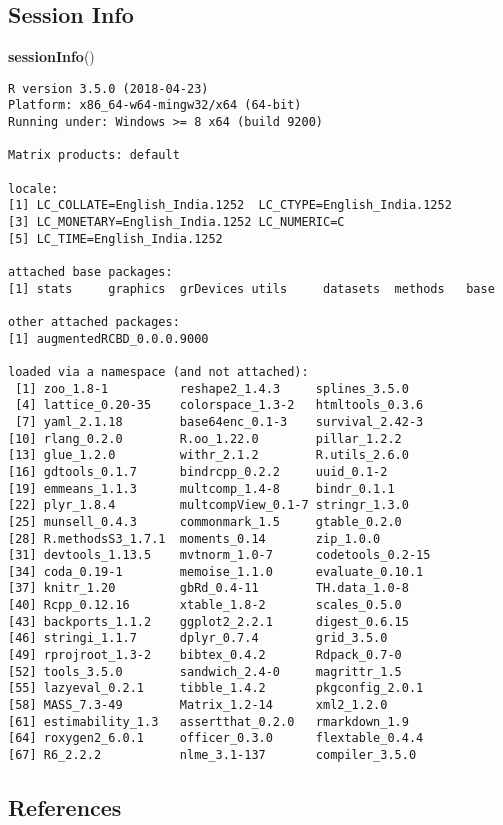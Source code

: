 \documentclass[]{article}
\newenvironment{Shaded}{\begin{snugshade}}{\end{snugshade}}
\newcommand{\KeywordTok}[1]{\textcolor[rgb]{0.13,0.29,0.53}{\textbf{#1}}}
\newcommand{\NormalTok}[1]{#1}
\begin{document}
\hypertarget{session-info}{%
\subsection{Session Info}\label{session-info}}

\begin{Shaded}
\begin{Highlighting}[]
\KeywordTok{sessionInfo}\NormalTok{()}
\end{Highlighting}
\end{Shaded}

\begin{verbatim}
R version 3.5.0 (2018-04-23)
Platform: x86_64-w64-mingw32/x64 (64-bit)
Running under: Windows >= 8 x64 (build 9200)

Matrix products: default

locale:
[1] LC_COLLATE=English_India.1252  LC_CTYPE=English_India.1252   
[3] LC_MONETARY=English_India.1252 LC_NUMERIC=C                  
[5] LC_TIME=English_India.1252    

attached base packages:
[1] stats     graphics  grDevices utils     datasets  methods   base     

other attached packages:
[1] augmentedRCBD_0.0.0.9000

loaded via a namespace (and not attached):
 [1] zoo_1.8-1          reshape2_1.4.3     splines_3.5.0     
 [4] lattice_0.20-35    colorspace_1.3-2   htmltools_0.3.6   
 [7] yaml_2.1.18        base64enc_0.1-3    survival_2.42-3   
[10] rlang_0.2.0        R.oo_1.22.0        pillar_1.2.2      
[13] glue_1.2.0         withr_2.1.2        R.utils_2.6.0     
[16] gdtools_0.1.7      bindrcpp_0.2.2     uuid_0.1-2        
[19] emmeans_1.1.3      multcomp_1.4-8     bindr_0.1.1       
[22] plyr_1.8.4         multcompView_0.1-7 stringr_1.3.0     
[25] munsell_0.4.3      commonmark_1.5     gtable_0.2.0      
[28] R.methodsS3_1.7.1  moments_0.14       zip_1.0.0         
[31] devtools_1.13.5    mvtnorm_1.0-7      codetools_0.2-15  
[34] coda_0.19-1        memoise_1.1.0      evaluate_0.10.1   
[37] knitr_1.20         gbRd_0.4-11        TH.data_1.0-8     
[40] Rcpp_0.12.16       xtable_1.8-2       scales_0.5.0      
[43] backports_1.1.2    ggplot2_2.2.1      digest_0.6.15     
[46] stringi_1.1.7      dplyr_0.7.4        grid_3.5.0        
[49] rprojroot_1.3-2    bibtex_0.4.2       Rdpack_0.7-0      
[52] tools_3.5.0        sandwich_2.4-0     magrittr_1.5      
[55] lazyeval_0.2.1     tibble_1.4.2       pkgconfig_2.0.1   
[58] MASS_7.3-49        Matrix_1.2-14      xml2_1.2.0        
[61] estimability_1.3   assertthat_0.2.0   rmarkdown_1.9     
[64] roxygen2_6.0.1     officer_0.3.0      flextable_0.4.4   
[67] R6_2.2.2           nlme_3.1-137       compiler_3.5.0    
\end{verbatim}

\hypertarget{references}{%
\subsection{References}\label{references}}
\end{document}
